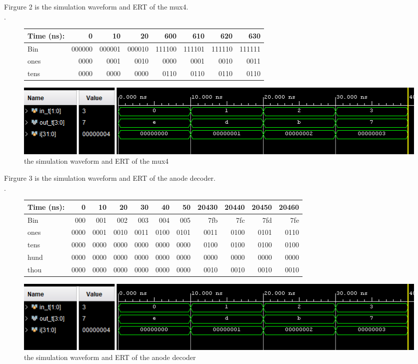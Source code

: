 \documentclass[11pt]{article}
\begin{document}
Firgure 2 is the simulation waveform and ERT of the mux4.\\
.\\
\begin{figure}[ht]\centering
	\begin{tabular}{l|rrr|rrrr}
		Time (ns): & 0 & 10 & 20 & 600 & 610 & 620 & 630 \\
		\midrule
		Bin & 000000 & 000001 & 000010 & 111100 & 111101 & 111110 & 111111 \\
		\midrule
		ones & 0000 & 0001 & 0010 & 0000 & 0001 & 0010 & 0011 \\
		tens & 0000 & 0000 & 0000 & 0110 & 0110 & 0110 & 0110 \\
		\bottomrule
	\end{tabular}\medskip
	
	\includegraphics[width=1\textwidth]{anode_decoder_simulation}
	\caption{the simulation waveform and ERT of the mux4}
	\label{fig:mux4_simulation}
\end{figure}


Firgure 3 is the simulation waveform and ERT of the anode decoder.\\
.\\
\begin{figure}[ht]\centering
	\begin{tabular}{l|rrrr|rrrr|rr}
		Time (ns): & 0 & 10 & 20 & 30 & 40 & 50 & 20430 & 20440 & 20450 & 20460 \\
		\midrule
		Bin & 000 & 001 & 002 & 003 & 004 & 005 & 7fb & 7fc & 7fd & 7fe \\
		\midrule
		ones & 0000 & 0001 & 0010 & 0011 & 0100 & 0101 & 0011 & 0100 & 0101 & 0110 \\
		tens & 0000 & 0000 & 0000 & 0000 & 0000 & 0000 & 0100 & 0100 & 0100 & 0100 \\
		hund & 0000 & 0000 & 0000 & 0000 & 0000 & 0000 & 0000 & 0000 & 0000 & 0000 \\
		thou & 0000 & 0000 & 0000 & 0000 & 0000 & 0000 & 0010 & 0010 & 0010 & 0010 \\
		\bottomrule
	\end{tabular}\medskip
	
	\includegraphics[width=1\textwidth]{anode_decoder_simulation}
	\caption{the simulation waveform and ERT of the anode decoder}
	\label{fig:anode_decoder_simulation}
\end{figure}
\end{document}
